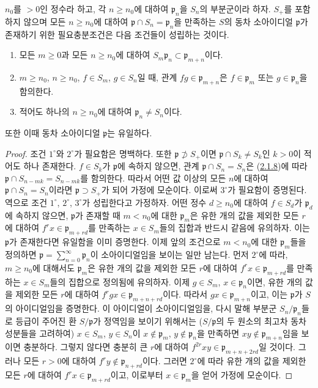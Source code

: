 \begin{proposition}[2.1.9]
\label{II.2.1.9-ko}
$n_0$를 $>0$인 정수라 하고, 각 $n\geq n_0$에 대하여
$\mathfrak{p}_n$을 $S_n$의 부분군이라 하자. $S_+$를 포함하지 않으며
모든 $n\geq n_0$에 대하여
$\mathfrak{p}\cap S_n=\mathfrak{p}_n$을 만족하는 $S$의 동차
소아이디얼 $\mathfrak{p}$가 존재하기 위한 필요충분조건은 다음 조건들이
성립하는 것이다.
\begin{enumerate}
  \item[$1^\circ$] 모든 $m\geq 0$과 모든 $n\geq n_0$에 대하여
    $S_m\mathfrak{p}_n\subset\mathfrak{p}_{m+n}$이다.
  \item[$2^\circ$] $m\geq n_0$, $n\geq n_0$, $f\in S_m$, $g\in S_n$일 때,
    관계 $fg\in\mathfrak{p}_{m+n}$은 $f\in\mathfrak{p}_m$ 또는
    $g\in\mathfrak{p}_n$을 함의한다.
  \item[$3^\circ$] 적어도 하나의 $n\geq n_0$에 대하여
    $\mathfrak{p}_n\neq S_n$이다.
\end{enumerate}
또한 이때 동차 소아이디얼 $\mathfrak{p}$는 유일하다.
\end{proposition}

\begin{proof}
조건 $1^\circ$와 $2^\circ$가 필요함은 명백하다. 또한
$\mathfrak{p}\not\supset S_+$이면
$\mathfrak{p}\cap S_k\neq S_k$인 $k>0$이 적어도 하나 존재한다.
$f\in S_k$가 $\mathfrak{p}$에 속하지 않으면, 관계
$\mathfrak{p}\cap S_n=S_n$은
(\hyperref[II.2.1.8-ko]{2.1.8})에 따라
$\mathfrak{p}\cap S_{n-mk}=S_{n-mk}$를 함의한다. 따라서 어떤 값 이상의
모든 $n$에 대하여 $\mathfrak{p}\cap S_n=S_n$이라면
$\mathfrak{p}\supset S_+$가 되어 가정에 모순이다. 이로써 $3^\circ$가
필요함이 증명된다. 역으로 조건 $1^\circ$, $2^\circ$, $3^\circ$가
성립한다고 가정하자. 어떤 정수 $d\geq n_0$에 대하여
$f\in S_d$가 $\mathfrak{p}_d$에 속하지 않으면, $\mathfrak{p}$가
존재할 때 $m<n_0$에 대한 $\mathfrak{p}_m$은 유한 개의 값을 제외한 모든
$r$에 대하여 $f^rx\in\mathfrak{p}_{m+rd}$를 만족하는
$x\in S_m$들의 집합과 반드시 같음에 유의하자. 이는 $\mathfrak{p}$가 존재한다면
유일함을 이미 증명한다. 이제 앞의 조건으로 $m<n_0$에 대한
$\mathfrak{p}_m$들을 정의하면
$\mathfrak{p}=\sum_{n=0}^{\infty}\mathfrak{p}_n$이 소아이디얼임을 보이는
일만 남는다. 먼저 $2^\circ$에 따라, $m\geq n_0$에 대해서도
$\mathfrak{p}_m$은 유한 개의 값을 제외한 모든 $r$에 대하여
$f^rx\in\mathfrak{p}_{m+rd}$를 만족하는 $x\in S_m$들의 집합으로
정의됨에 유의하자. 이제
$g\in S_m$, $x\in\mathfrak{p}_n$이면, 유한 개의 값을 제외한 모든
$r$에 대하여 $f^rgx\in\mathfrak{p}_{m+n+rd}$이다. 따라서
$gx\in\mathfrak{p}_{m+n}$이고, 이는 $\mathfrak{p}$가 $S$의
아이디얼임을 증명한다. 이 아이디얼이 소아이디얼임을, 다시 말해 부분군
$S_n/\mathfrak{p}_n$들로 등급이 주어진 환 $S/\mathfrak{p}$가 정역임을
보이기 위해서는 ($S/\mathfrak{p}$의 두 원소의 최고차 동차성분들을
고려하여) $x\in S_m$, $y\in S_n$이
$x\notin\mathfrak{p}_m$, $y\notin\mathfrak{p}_n$을 만족하면
$xy\notin\mathfrak{p}_{m+n}$임을 보이면 충분하다. 그렇지 않다면 충분히
큰 $r$에 대하여 $f^{2r}xy\in\mathfrak{p}_{m+n+2rd}$일 것이다. 그러나
모든 $r>0$에 대하여 $f^ry\notin\mathfrak{p}_{n+rd}$이다. 그러면
$2^\circ$에 따라 유한 개의 값을 제외한 모든 $r$에 대하여
$f^rx\in\mathfrak{p}_{m+rd}$이고, 이로부터
$x\in\mathfrak{p}_m$을 얻어 가정에 모순이다.
\end{proof}

